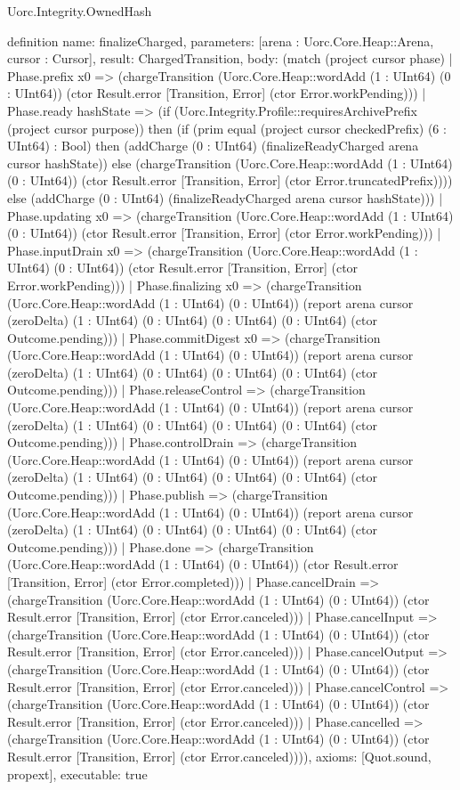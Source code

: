 \begin{lexlean}{Uorc.Integrity.OwnedHash}
\begin{semanticmodule}
definition{
  name: finalizeCharged,
  parameters: [arena : Uorc.Core.Heap::Arena, cursor : Cursor],
  result: ChargedTransition,
  body: (match (project cursor phase)
    | Phase.prefix x0 => (chargeTransition (Uorc.Core.Heap::wordAdd (1 : UInt64) (0 : UInt64)) (ctor Result.error [Transition, Error] (ctor Error.workPending)))
    | Phase.ready hashState => (if (Uorc.Integrity.Profile::requiresArchivePrefix (project cursor purpose)) then (if (prim equal (project cursor checkedPrefix) (6 : UInt64) : Bool) then (addCharge (0 : UInt64) (finalizeReadyCharged arena cursor hashState)) else (chargeTransition (Uorc.Core.Heap::wordAdd (1 : UInt64) (0 : UInt64)) (ctor Result.error [Transition, Error] (ctor Error.truncatedPrefix)))) else (addCharge (0 : UInt64) (finalizeReadyCharged arena cursor hashState)))
    | Phase.updating x0 => (chargeTransition (Uorc.Core.Heap::wordAdd (1 : UInt64) (0 : UInt64)) (ctor Result.error [Transition, Error] (ctor Error.workPending)))
    | Phase.inputDrain x0 => (chargeTransition (Uorc.Core.Heap::wordAdd (1 : UInt64) (0 : UInt64)) (ctor Result.error [Transition, Error] (ctor Error.workPending)))
    | Phase.finalizing x0 => (chargeTransition (Uorc.Core.Heap::wordAdd (1 : UInt64) (0 : UInt64)) (report arena cursor (zeroDelta) (1 : UInt64) (0 : UInt64) (0 : UInt64) (0 : UInt64) (ctor Outcome.pending)))
    | Phase.commitDigest x0 => (chargeTransition (Uorc.Core.Heap::wordAdd (1 : UInt64) (0 : UInt64)) (report arena cursor (zeroDelta) (1 : UInt64) (0 : UInt64) (0 : UInt64) (0 : UInt64) (ctor Outcome.pending)))
    | Phase.releaseControl => (chargeTransition (Uorc.Core.Heap::wordAdd (1 : UInt64) (0 : UInt64)) (report arena cursor (zeroDelta) (1 : UInt64) (0 : UInt64) (0 : UInt64) (0 : UInt64) (ctor Outcome.pending)))
    | Phase.controlDrain => (chargeTransition (Uorc.Core.Heap::wordAdd (1 : UInt64) (0 : UInt64)) (report arena cursor (zeroDelta) (1 : UInt64) (0 : UInt64) (0 : UInt64) (0 : UInt64) (ctor Outcome.pending)))
    | Phase.publish => (chargeTransition (Uorc.Core.Heap::wordAdd (1 : UInt64) (0 : UInt64)) (report arena cursor (zeroDelta) (1 : UInt64) (0 : UInt64) (0 : UInt64) (0 : UInt64) (ctor Outcome.pending)))
    | Phase.done => (chargeTransition (Uorc.Core.Heap::wordAdd (1 : UInt64) (0 : UInt64)) (ctor Result.error [Transition, Error] (ctor Error.completed)))
    | Phase.cancelDrain => (chargeTransition (Uorc.Core.Heap::wordAdd (1 : UInt64) (0 : UInt64)) (ctor Result.error [Transition, Error] (ctor Error.canceled)))
    | Phase.cancelInput => (chargeTransition (Uorc.Core.Heap::wordAdd (1 : UInt64) (0 : UInt64)) (ctor Result.error [Transition, Error] (ctor Error.canceled)))
    | Phase.cancelOutput => (chargeTransition (Uorc.Core.Heap::wordAdd (1 : UInt64) (0 : UInt64)) (ctor Result.error [Transition, Error] (ctor Error.canceled)))
    | Phase.cancelControl => (chargeTransition (Uorc.Core.Heap::wordAdd (1 : UInt64) (0 : UInt64)) (ctor Result.error [Transition, Error] (ctor Error.canceled)))
    | Phase.cancelled => (chargeTransition (Uorc.Core.Heap::wordAdd (1 : UInt64) (0 : UInt64)) (ctor Result.error [Transition, Error] (ctor Error.canceled)))),
  axioms: [Quot.sound, propext],
  executable: true
}


\end{semanticmodule}
\end{lexlean}
